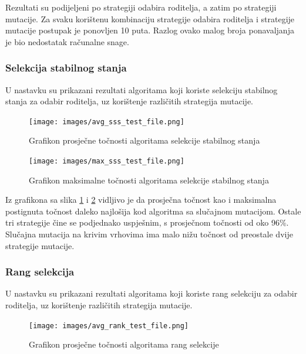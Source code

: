 \documentclass[times, utf8, zavrsni, numeric]{fer}
\begin{document}
Rezultati su podijeljeni po strategiji odabira roditelja, a zatim po strategiji mutacije. Za svaku korištenu kombinaciju strategije odabira roditelja i strategije mutacije postupak je ponovljen 10 puta. Razlog ovako malog broja ponavaljanja je bio nedostatak računalne snage.

\newpage
\subsubsection{Selekcija stabilnog stanja}
U nastavku su prikazani rezultati algoritama koji koriste selekciju stabilnog stanja za odabir roditelja, uz korištenje različitih strategija mutacije.

\begin{figure}[h]
\centering
\texttt{[image: images/avg\_sss\_test\_file.png]}
\caption{Grafikon prosječne točnosti algoritama selekcije stabilnog stanja}
\label{fig:grafikon prosjecne tocnosti algoritama selekcije stabilnog stanja}
\end{figure}

\begin{figure}[h]
\centering
\texttt{[image: images/max\_sss\_test\_file.png]}
\caption{Grafikon maksimalne točnosti algoritama selekcije stabilnog stanja}
\label{fig:grafikon maksimalne tocnosti algoritama selekcije stabilnog stanja}
\end{figure}

Iz grafikona sa slika \ref{fig:grafikon prosjecne tocnosti algoritama selekcije stabilnog stanja} i \ref{fig:grafikon maksimalne tocnosti algoritama selekcije stabilnog stanja} vidljivo je da prosječna točnost kao i maksimalna postignuta točnost daleko najlošija kod algoritma sa slučajnom mutacijom. Ostale tri strategije čine se podjednako uspješnim, s prosječnom točnosti od oko 96\%. Slučajna mutacija na krivim vrhovima ima malo nižu točnost od preostale dvije strategije mutacije.

\newpage
\subsubsection{Rang selekcija}
U nastavku su prikazani rezultati algoritama koji koriste rang selekciju za odabir roditelja, uz korištenje različitih strategija mutacije.

\begin{figure}[h]
\centering
\texttt{[image: images/avg\_rank\_test\_file.png]}
\caption{Grafikon prosječne točnosti algoritama rang selekcije}
\label{fig:grafikon prosjecne tocnosti algoritama rank selekcije}
\end{figure}
\end{document}
